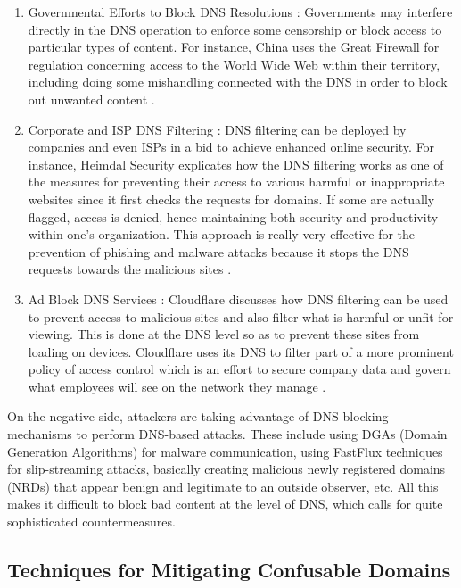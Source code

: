\begin{enumerate}
    \item Governmental Efforts to Block DNS Resolutions : Governments may interfere directly in the DNS operation to enforce some censorship or block access to particular types of content. For instance, China uses the Great Firewall for regulation concerning access to the World Wide Web within their territory, including doing some mishandling connected with the DNS in order to block out unwanted content \cite{XuAlbert2017MediaCensorship}.
    \item Corporate and ISP DNS Filtering : DNS filtering can be deployed by companies and even ISPs in a bid to achieve enhanced online security. For instance, Heimdal Security explicates how the DNS filtering works as one of the measures for preventing their access to various harmful or inappropriate websites since it first checks the requests for domains. If some are actually flagged, access is denied, hence maintaining both security and productivity within one's organization. This approach is really very effective for the prevention of phishing and malware attacks because it stops the DNS requests towards the malicious sites \cite{
HeimdalDNSSecurity2023}.
    \item Ad Block DNS Services :  Cloudflare discusses how DNS filtering can be used to prevent access to malicious sites and also filter what is harmful or unfit for viewing. This is done at the DNS level so as to prevent these sites from loading on devices. Cloudflare uses its DNS to filter part of a more prominent policy of access control which is an effort to secure company data and govern what employees will see on the network they manage \cite{CloudflareDNSFiltering2023} .   
\end{enumerate}

 On the negative side, attackers are taking advantage of DNS blocking mechanisms to perform DNS-based attacks. These include using DGAs (Domain Generation Algorithms) for malware communication, using FastFlux techniques for slip-streaming attacks, basically creating malicious newly registered domains (NRDs) that appear benign and legitimate to an outside observer, etc. All this makes it difficult to block bad content at the level of DNS, which calls for quite sophisticated countermeasures.


\subsection{Techniques for Mitigating Confusable Domains}

